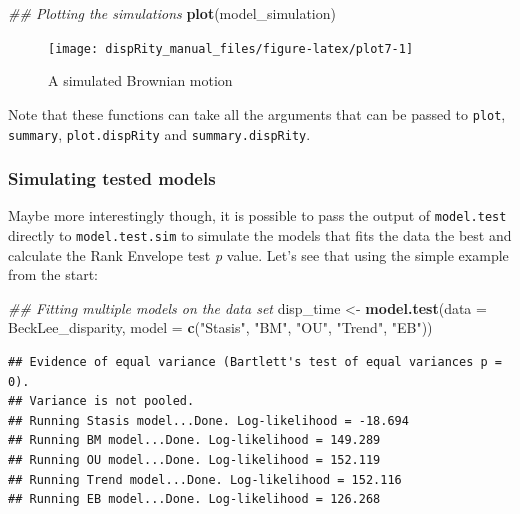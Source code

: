 \documentclass[
]{book}
\newenvironment{Shaded}{\begin{snugshade}}{\end{snugshade}}
\newcommand{\CommentTok}[1]{\textcolor[rgb]{0.56,0.35,0.01}{\textit{#1}}}
\newcommand{\DataTypeTok}[1]{\textcolor[rgb]{0.13,0.29,0.53}{#1}}
\newcommand{\KeywordTok}[1]{\textcolor[rgb]{0.13,0.29,0.53}{\textbf{#1}}}
\newcommand{\NormalTok}[1]{#1}
\newcommand{\StringTok}[1]{\textcolor[rgb]{0.31,0.60,0.02}{#1}}
\begin{document}
\begin{Shaded}
\begin{Highlighting}[]
\CommentTok{\#\# Plotting the simulations}
\KeywordTok{plot}\NormalTok{(model\_simulation)}
\end{Highlighting}
\end{Shaded}

\begin{figure}

{\centering \texttt{[image: dispRity\_manual\_files/figure-latex/plot7-1]} 

}

\caption{A simulated Brownian motion}\label{fig:plot7}
\end{figure}

Note that these functions can take all the arguments that can be passed to \texttt{plot}, \texttt{summary}, \texttt{plot.dispRity} and \texttt{summary.dispRity}.

\hypertarget{simulating-tested-models}{%
\subsubsection{Simulating tested models}\label{simulating-tested-models}}

Maybe more interestingly though, it is possible to pass the output of \texttt{model.test} directly to \texttt{model.test.sim} to simulate the models that fits the data the best and calculate the Rank Envelope test \emph{p} value.
Let's see that using the simple example from the start:

\begin{Shaded}
\begin{Highlighting}[]
\CommentTok{\#\# Fitting multiple models on the data set}
\NormalTok{disp\_time \textless{}{-}}\StringTok{ }\KeywordTok{model.test}\NormalTok{(}\DataTypeTok{data =}\NormalTok{ BeckLee\_disparity,}
                    \DataTypeTok{model =} \KeywordTok{c}\NormalTok{(}\StringTok{"Stasis"}\NormalTok{, }\StringTok{"BM"}\NormalTok{, }\StringTok{"OU"}\NormalTok{, }\StringTok{"Trend"}\NormalTok{, }\StringTok{"EB"}\NormalTok{))}
\end{Highlighting}
\end{Shaded}

\begin{verbatim}
## Evidence of equal variance (Bartlett's test of equal variances p = 0).
## Variance is not pooled.
## Running Stasis model...Done. Log-likelihood = -18.694
## Running BM model...Done. Log-likelihood = 149.289
## Running OU model...Done. Log-likelihood = 152.119
## Running Trend model...Done. Log-likelihood = 152.116
## Running EB model...Done. Log-likelihood = 126.268
\end{verbatim}
\end{document}

